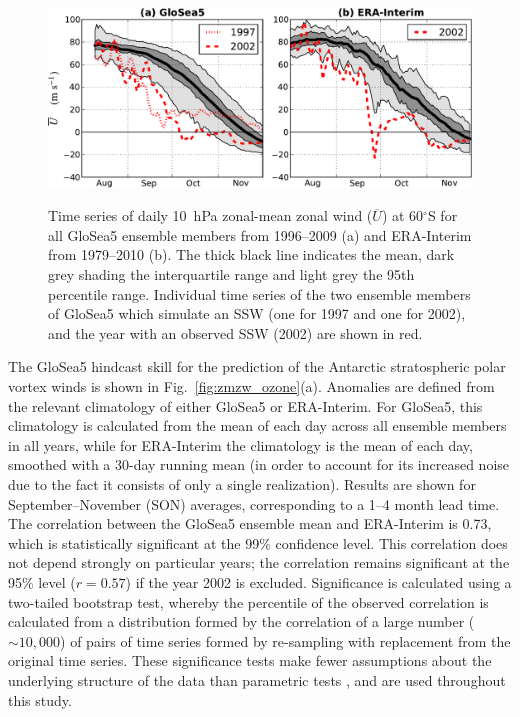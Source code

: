 \begin{figure}[t]
  \noindent\includegraphics[width=\textwidth,angle=0]{figures/chapter-seasonal/zmzw_climatologies_crop.pdf}\\
  \caption[Comparison of GloSea5 and ERA-Interim zonal-mean zonal wind
climatologies.]{Time series of daily 10~hPa zonal-mean zonal wind
($\overline{U}$) at 60$^{\circ}$S for all GloSea5 ensemble members from
1996--2009 (a) and ERA-Interim from 1979--2010 (b). The thick black line
indicates the mean, dark grey shading the interquartile range and light grey the
95th percentile range. Individual time series of the two ensemble members of
GloSea5 which simulate an SSW (one for 1997 and one for 2002), and the year with
an observed SSW (2002) are shown in red.}\label{fig:sh_zmzw_clim}
\end{figure}

The GloSea5 hindcast skill for the prediction of the Antarctic stratospheric
polar vortex winds is shown in Fig.\ \ref{fig:zmzw_ozone}(a). Anomalies are
defined from the relevant climatology of either GloSea5 or ERA-Interim. For
GloSea5, this climatology is calculated from the mean of each day across all
ensemble members in all years, while for ERA-Interim the climatology is the mean
of each day, smoothed with a 30-day running mean (in order to account for its
increased noise due to the fact it consists of only a single
realization). Results are shown for September--November (SON) averages,
corresponding to a 1--4 month lead time. The correlation between the GloSea5
ensemble mean and ERA-Interim is 0.73, which is statistically significant at the
99\% confidence level. This correlation does not depend strongly on particular
years; the correlation remains significant at the 95\% level ($r=0.57$) if the
year 2002 is excluded. Significance is calculated using a two-tailed bootstrap
test, whereby the percentile of the observed correlation is calculated from a
distribution formed by the correlation of a large number ($\sim 10,000$) of
pairs of time series formed by re-sampling with replacement from the original
time series. These significance tests make fewer assumptions about the
underlying structure of the data than parametric tests \citep{Wilks}, and are
used throughout this study.

